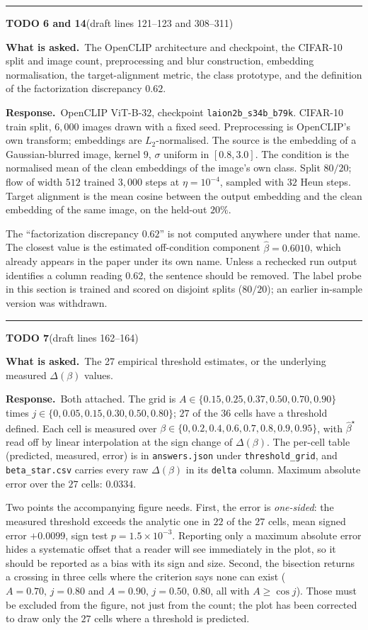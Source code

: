 \documentclass[11pt]{article}
\newenvironment{todoitem}[2]{%
  \par\medskip\noindent\rule{\textwidth}{0.7pt}\par\nobreak\smallskip
  \noindent\textbf{\large TODO #1}\quad\textnormal{\small(draft #2)}\par\nobreak\smallskip
}{\par\medskip}
\newcommand{\ask}[1]{\noindent\textbf{What is asked.}\ #1\par\smallskip}
\newcommand{\resp}[1]{\noindent\textbf{Response.}\ #1\par}
\begin{document}
\begin{todoitem}{6 and 14}{lines 121--123 and 308--311}
\ask{The OpenCLIP architecture and checkpoint, the CIFAR-10 split and image count, preprocessing
and blur construction, embedding normalisation, the target-alignment metric, the class prototype,
and the definition of the factorization discrepancy $0.62$.}

\resp{OpenCLIP ViT-B-32, checkpoint \texttt{laion2b\_s34b\_b79k}. CIFAR-10 train split,
$6{,}000$ images drawn with a fixed seed. Preprocessing is OpenCLIP's own transform; embeddings
are $L_2$-normalised. The source is the embedding of a Gaussian-blurred image, kernel $9$,
$\sigma$ uniform in $[0.8,3.0]$. The condition is the normalised mean of the clean embeddings of
the image's own class. Split $80/20$; flow of width $512$ trained $3{,}000$ steps at
$\eta=10^{-4}$, sampled with $32$ Heun steps. Target alignment is the mean cosine between the
output embedding and the clean embedding of the same image, on the held-out $20\%$.

The ``factorization discrepancy $0.62$'' is not computed anywhere under that name. The closest
value is the estimated off-condition component $\hat\beta=0.6010$, which already appears in the
paper under its own name. Unless a rechecked run output identifies a column reading $0.62$, the
sentence should be removed. The label probe in this section is trained and scored on disjoint
splits ($80/20$); an earlier in-sample version was withdrawn.}
\end{todoitem}

\begin{todoitem}{7}{lines 162--164}
\ask{The 27 empirical threshold estimates, or the underlying measured $\Delta(\beta)$ values.}

\resp{Both attached. The grid is $A\in\{0.15,0.25,0.37,0.50,0.70,0.90\}$ times
$j\in\{0,0.05,0.15,0.30,0.50,0.80\}$; $27$ of the $36$ cells have a threshold defined. Each cell
is measured over $\beta\in\{0,0.2,0.4,0.6,0.7,0.8,0.9,0.95\}$, with $\widehat\beta^\star$ read
off by linear interpolation at the sign change of $\Delta(\beta)$. The per-cell table
(predicted, measured, error) is in \texttt{answers.json} under \texttt{threshold\_grid}, and
\texttt{beta\_star.csv} carries every raw $\Delta(\beta)$ in its \texttt{delta} column. Maximum
absolute error over the $27$ cells: $0.0334$.

Two points the accompanying figure needs. First, the error is \emph{one-sided}: the measured
threshold exceeds the analytic one in $22$ of the $27$ cells, mean signed error $+0.0099$, sign
test $p=1.5\times10^{-3}$. Reporting only a maximum absolute error hides a systematic offset that
a reader will see immediately in the plot, so it should be reported as a bias with its sign and
size. Second, the bisection returns a crossing in three cells where the criterion says none can
exist ($A=0.70,\,j=0.80$ and $A=0.90,\,j=0.50,\,0.80$, all with $A\ge\cos j$). Those must be
excluded from the figure, not just from the count; the plot has been corrected to draw only the
$27$ cells where a threshold is predicted.}
\end{todoitem}
\end{document}
